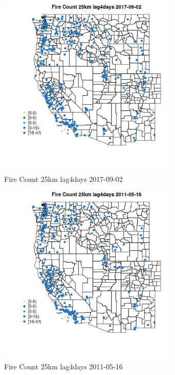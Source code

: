 \begin{figure} 
\centering  
\includegraphics[width=0.77\textwidth]{Code_Outputs/Report_ML_input_PM25_Step4_part_e_de_duplicated_aves_compiled_2019-05-21wNAs_MapObsFire_Count_25km_lag4days2017-09-02.jpg} 
\caption{\label{fig:Report_ML_input_PM25_Step4_part_e_de_duplicated_aves_compiled_2019-05-21wNAsMapObsFire_Count_25km_lag4days2017-09-02}Fire Count 25km lag4days 2017-09-02} 
\end{figure} 
 

\begin{figure} 
\centering  
\includegraphics[width=0.77\textwidth]{Code_Outputs/Report_ML_input_PM25_Step4_part_e_de_duplicated_aves_compiled_2019-05-21wNAs_MapObsFire_Count_25km_lag4days2011-05-16.jpg} 
\caption{\label{fig:Report_ML_input_PM25_Step4_part_e_de_duplicated_aves_compiled_2019-05-21wNAsMapObsFire_Count_25km_lag4days2011-05-16}Fire Count 25km lag4days 2011-05-16} 
\end{figure} 
 

